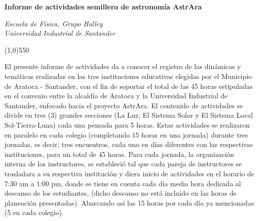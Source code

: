 \documentclass[a4paper,10pt]{article}
\begin{document}
\begin{center}
\Large\textbf{{Informe de actividades semillero de astronomía AstrAra}}
\vspace{0.4cm}

\normalsize
\textit{ }

\vspace{0.1cm}

\textit{\small{Escuela de Física, Grupo Halley}\\
\small{Universidad Industrial de Santander}}
\medskip
\medskip
\normalsize


\end{center}
\line(1,0){550}
\vspace{0.1cm}





\noindent El presente informe de actividades da a conocer el registro de las dinámicas y temáticas realizadas en las tres instituciones educativas elegidas por el Municipio de Aratoca - Santander, con el fin de soportar el total de las 45 horas estipuladas en el convenio entre la alcaldía de Aratoca y la Universidad Industrial de Santander, enfocado hacia el proyecto AstrAra. El contenido de actividades se divide en tres (3) grandes secciones (La Luz, El Sistema Solar y El Sistema Local Sol-Tierra-Luna) cada una pensada para 5 horas. Estas actividades se realizaron en paralelo en cada colegio (completando 15 horas en una jornada) durante tres jornadas, es decir, tres encuentros, cada uno en días diferentes con las respectivas instituciones, para un total de 45 horas. Para cada jornada, la organización interna de los instructores, se estableció tal que cada pareja de instructores se trasladara a su respectiva institución y diera inicio de actividades en el horario de 7:30 am a 1:00 pm, donde se tiene en cuenta cada día media hora dedicada al descanso de los estudiantes, (dicho descanso no está incluido en las horas de planeación presentadas). Abarcando así las 15 horas por cada día ya mencionadas (5 en cada colegio).
\end{document}
